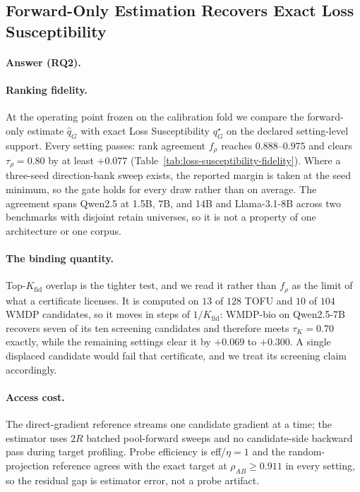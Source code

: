 \subsection{Forward-Only Estimation Recovers Exact Loss Susceptibility}
\label{sec:exp-fidelity}

\paragraph{Answer (RQ2).}
{\setlength{\emergencystretch}{3em}\FidelityHeadline\par}

\paragraph{Ranking fidelity.}
At the operating point frozen on the calibration fold we compare the
forward-only estimate $\widehat q_G$ with exact Loss Susceptibility
$q_G^\star$ on the declared setting-level support. Every setting passes:
rank agreement $f_\rho$ reaches $0.888$--$0.975$ and clears
$\tau_\rho=0.80$ by at least $+0.077$
(Table~\ref{tab:loss-susceptibility-fidelity}). Where a three-seed
direction-bank sweep exists, the reported margin is taken at the seed
minimum, so the gate holds for every draw rather than on average. The
agreement spans Qwen2.5 at 1.5B, 7B, and 14B and Llama-3.1-8B across two
benchmarks with disjoint retain universes, so it is not a property of one
architecture or one corpus.

\paragraph{The binding quantity.}
Top-$K_{\mathrm{fid}}$ overlap is the tighter test, and we read it rather
than $f_\rho$ as the limit of what a certificate licenses. It is computed on
$13$ of $128$ TOFU and $10$ of $104$ WMDP candidates, so it moves in steps of
$1/K_{\mathrm{fid}}$: WMDP-bio on Qwen2.5-7B recovers seven of its ten
screening candidates and therefore meets $\tau_K=0.70$ exactly, while the
remaining settings clear it by $+0.069$ to $+0.300$. A single displaced
candidate would fail that certificate, and we treat its screening claim
accordingly.

\paragraph{Access cost.}
The direct-gradient reference streams one candidate gradient at a time; the
estimator uses $2R$ batched pool-forward sweeps and no candidate-side
backward pass during target profiling. Probe efficiency is eff/$\eta=1$ and
the random-projection reference agrees with the exact target at
$\rho_{AB}\ge0.911$ in every setting, so the residual gap is estimator
error, not a probe artifact.

